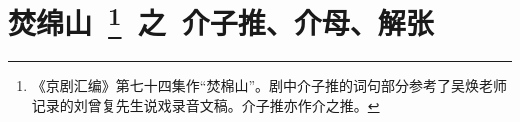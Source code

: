 \newpage
{} %
\section*{\large\hei 焚绵山~\protect\footnote{《京剧汇编》第七十四集作``焚棉山''。剧中介子推的词句部分参考了吴焕老师记录的刘曾复先生说戏录音文稿。介子推亦作介之推。}{\large\hei ~{\small 之}~介子推、介母、解张}}

